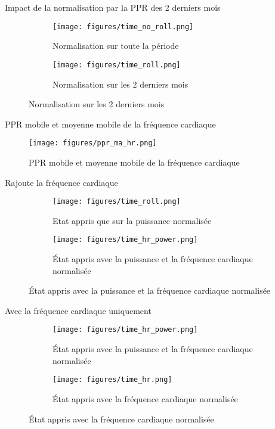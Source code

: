 \documentclass{beamer}
\begin{document}
\begin{frame}{Impact de la normalisation par la PPR des 2 derniers mois}
    \begin{figure}
        \begin{subfigure}{0.45\textwidth}
            \centering
            \texttt{[image: figures/time\_no\_roll.png]}
            \caption{Normalisation sur toute la période}
            
        \end{subfigure}
        \begin{subfigure}{0.45\textwidth}
            \centering
            \texttt{[image: figures/time\_roll.png]}
            \caption{Normalisation sur les 2 derniers mois}
        \end{subfigure}
    \end{figure}
\end{frame}
\begin{frame}{PPR mobile et moyenne mobile de la fréquence cardiaque}
    \begin{figure}
        \centering
        \texttt{[image: figures/ppr\_ma\_hr.png]}
        \caption{PPR mobile et moyenne mobile de la fréquence cardiaque}
    \end{figure}
\end{frame}

\begin{frame}{Rajoute la fréquence cardiaque}
    \begin{figure}
        \begin{subfigure}{0.45\textwidth}
            \centering
            \texttt{[image: figures/time\_roll.png]}
            \caption{Etat appris que sur la puissance normalisée}
        \end{subfigure}
        \begin{subfigure}{0.45\textwidth}
            \centering
            \texttt{[image: figures/time\_hr\_power.png]}
            \caption{État appris avec la puissance et la fréquence cardiaque normalisée}
        \end{subfigure}
    \end{figure}    
\end{frame}

\begin{frame}{Avec la fréquence cardiaque uniquement}
    \begin{figure}
        \begin{subfigure}{0.45\textwidth}
            \centering
            \texttt{[image: figures/time\_hr\_power.png]}
            \caption{État appris avec la puissance et la fréquence cardiaque normalisée}
        \end{subfigure}
        \begin{subfigure}{0.45\textwidth}
            \centering
            \texttt{[image: figures/time\_hr.png]}
            \caption{État appris avec la fréquence cardiaque normalisée}
        \end{subfigure}
    \end{figure}
\end{frame}
\end{document}
